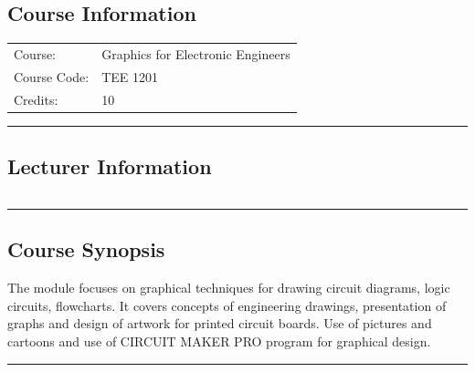 
\subsection*{Course Information}
\vspace{0ex}%
\noindent\parbox{0.5\textwidth}{%
    \noindent\begin{tabular}{@{}ll}
                 \textsf{Course:}          & 	Graphics for Electronic Engineers \\
                 \textsf{Course Code:}         & 	TEE 1201 \\
                 \textsf{Credits:}    & 	10
    \end{tabular}}
\vspace{2ex}\hrule\vspace{2ex}

\subsection*{Lecturer Information}
\noindent\parbox{0.5\textwidth}{%
    \noindent\begin{tabular}{@{}ll}
                
    \end{tabular}}
\vspace{2ex}\hrule\vspace{2ex}


\subsection*{Course Synopsis}
The module focuses on graphical techniques for drawing circuit diagrams, logic circuits, flowcharts.
It covers concepts of engineering drawings, presentation of graphs and design of artwork for printed circuit boards.
Use of pictures and cartoons and use of CIRCUIT MAKER PRO program for graphical design.
\vspace{2ex} \hrule\vspace{2ex}

